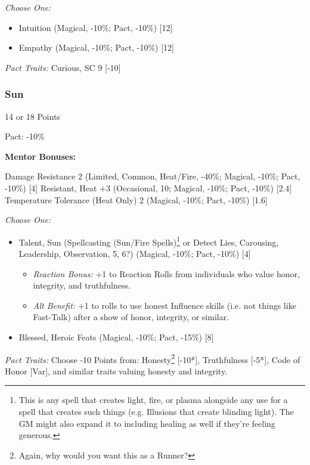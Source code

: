 \begin{multicols}{3}
	\textit{Choose One:}
	\begin{itemize}
		\itemsep 0pt
		\item Intuition (Magical, -10\%; Pact, -10\%) [12]
		\item Empathy (Magical, -10\%; Pact, -10\%) [12]
	\end{itemize}
	
	\textit{Pact Traits:} Curious, SC 9 [-10]
	
	\subsubsection{Sun}
	\begin{flushright}
		14 or 18 Points
	\end{flushright}
	Pact: -10\%
	
	
	\textbf{Mentor Bonuses:} 
	
	Damage Resistance 2 (Limited, Common, Heat/Fire, -40\%; Magical, -10\%; Pact, -10\%) [4]
	Resistant, Heat +3 (Occasional, 10; Magical, -10\%; Pact, -10\%) [2.4]
	Temperature Tolerance (Heat Only) 2 (Magical, -10\%; Pact, -10\%) [1.6]
	
	\textit{Choose One:}
	\begin{itemize}
		\itemsep 0pt
		\item Talent, Sun (Spellcasting (Sun/Fire Spells)\footnote{This is any spell that creates light, fire, or plasma alongside any use for a spell that creates such things (e.g. Illusions that create blinding light). The GM might also expand it to including healing as well if they're feeling generous.} or Detect Lies, Carousing, Leadership, Observation, 5, 6?) (Magical, -10\%; Pact, -10\%) [4]
		\begin{itemize}
			\itemsep 0pt
			\item \textit{Reaction Bonus:} +1 to Reaction Rolls from individuals who value honor, integrity, and truthfulness.
			\item \textit{Alt Benefit:} +1 to rolls to use honest Influence skills (i.e. not things like Fast-Talk) after a show of honor, integrity, or similar.
		\end{itemize}
		\item Blessed, Heroic Feats (Magical, -10\%; Pact, -15\%) [8]
	\end{itemize}

	\textit{Pact Traits:} Choose -10 Points from: Honesty\footnote{Again, why would you want this as a Runner?} [-10*], Truthfulness [-5*], Code of Honor [Var], and similar traits valuing honesty and integrity.
	

\end{multicols}

